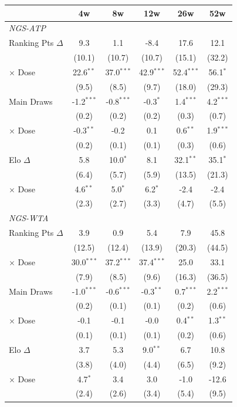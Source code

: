 \begin{tabular}{l*{5}{c}}
\toprule
 & 4w & 8w & 12w & 26w & 52w \\
\midrule
\multicolumn{6}{l}{\textit{NGS-ATP}} \\
  Ranking Pts $\Delta$ & 9.3 & 1.1 & -8.4 & 17.6 & 12.1 \\
  & (10.1) & (10.7) & (10.7) & (15.1) & (32.2) \\
  $\times$ Dose & 22.6$^{**}$ & 37.0$^{***}$ & 42.9$^{***}$ & 52.4$^{***}$ & 56.1$^{*}$ \\
  & (9.5) & (8.5) & (9.7) & (18.0) & (29.3) \\[0.3em]
  Main Draws & -1.2$^{***}$ & -0.8$^{***}$ & -0.3$^{*}$ & 1.4$^{***}$ & 4.2$^{***}$ \\
  & (0.2) & (0.2) & (0.2) & (0.3) & (0.7) \\
  $\times$ Dose & -0.3$^{**}$ & -0.2 & 0.1 & 0.6$^{**}$ & 1.9$^{***}$ \\
  & (0.2) & (0.1) & (0.1) & (0.3) & (0.6) \\[0.3em]
  Elo $\Delta$ & 5.8 & 10.0$^{*}$ & 8.1 & 32.1$^{**}$ & 35.1$^{*}$ \\
  & (6.4) & (5.7) & (5.9) & (13.5) & (21.3) \\
  $\times$ Dose & 4.6$^{**}$ & 5.0$^{*}$ & 6.2$^{*}$ & -2.4 & -2.4 \\
  & (2.3) & (2.7) & (3.3) & (4.7) & (5.5) \\[0.3em]
\midrule
\multicolumn{6}{l}{\textit{NGS-WTA}} \\
  Ranking Pts $\Delta$ & 3.9 & 0.9 & 5.4 & 7.9 & 45.8 \\
  & (12.5) & (12.4) & (13.9) & (20.3) & (44.5) \\
  $\times$ Dose & 30.0$^{***}$ & 37.2$^{***}$ & 37.4$^{***}$ & 25.0 & 33.1 \\
  & (7.9) & (8.5) & (9.6) & (16.3) & (36.5) \\[0.3em]
  Main Draws & -1.0$^{***}$ & -0.6$^{***}$ & -0.3$^{**}$ & 0.7$^{***}$ & 2.2$^{***}$ \\
  & (0.2) & (0.1) & (0.1) & (0.2) & (0.6) \\
  $\times$ Dose & -0.1 & -0.1 & -0.0 & 0.4$^{**}$ & 1.3$^{**}$ \\
  & (0.1) & (0.1) & (0.1) & (0.2) & (0.6) \\[0.3em]
  Elo $\Delta$ & 3.7 & 5.3 & 9.0$^{**}$ & 6.7 & 10.8 \\
  & (3.8) & (4.0) & (4.4) & (6.5) & (9.2) \\
  $\times$ Dose & 4.7$^{*}$ & 3.4 & 3.0 & -1.0 & -12.6 \\
  & (2.4) & (2.6) & (3.4) & (5.4) & (9.5) \\[0.3em]
\midrule
\bottomrule
\end{tabular}
